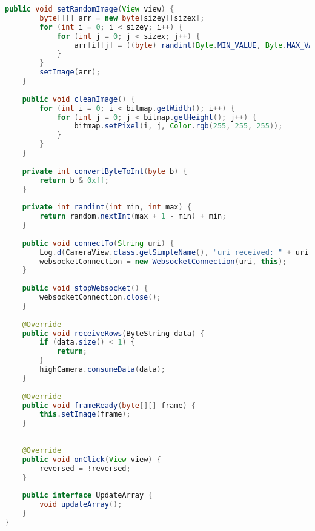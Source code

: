 \documentclass[hidelinks,11pt,a4paper,oneside,article]{memoir}
\begin{document}
\begin{lstlisting}[label={listing:cameraview},caption={CameraView class, extending ImageView},language=Java, style=styleprogrammingappendix]
    public void setRandomImage(View view) {
        byte[][] arr = new byte[sizey][sizex];
        for (int i = 0; i < sizey; i++) {
            for (int j = 0; j < sizex; j++) {
                arr[i][j] = ((byte) randint(Byte.MIN_VALUE, Byte.MAX_VALUE));
            }
        }
        setImage(arr);
    }
    
    public void cleanImage() {
        for (int i = 0; i < bitmap.getWidth(); i++) {
            for (int j = 0; j < bitmap.getHeight(); j++) {
                bitmap.setPixel(i, j, Color.rgb(255, 255, 255));
            }
        }
    }
    
    private int convertByteToInt(byte b) {
        return b & 0xff;
    }
    
    private int randint(int min, int max) {
        return random.nextInt(max + 1 - min) + min;
    }
    
    public void connectTo(String uri) {
        Log.d(CameraView.class.getSimpleName(), "uri received: " + uri);
        websocketConnection = new WebsocketConnection(uri, this);
    }
    
    public void stopWebsocket() {
        websocketConnection.close();
    }
    
    @Override
    public void receiveRows(ByteString data) {
        if (data.size() < 1) {
            return;
        }
        highCamera.consumeData(data);
    }
    
    @Override
    public void frameReady(byte[][] frame) {
        this.setImage(frame);
    }
    
    
    @Override
    public void onClick(View view) {
        reversed = !reversed;
    }
    
    public interface UpdateArray {
        void updateArray();
    }
}
\end{lstlisting}\vspace{14pt}
\end{document}
